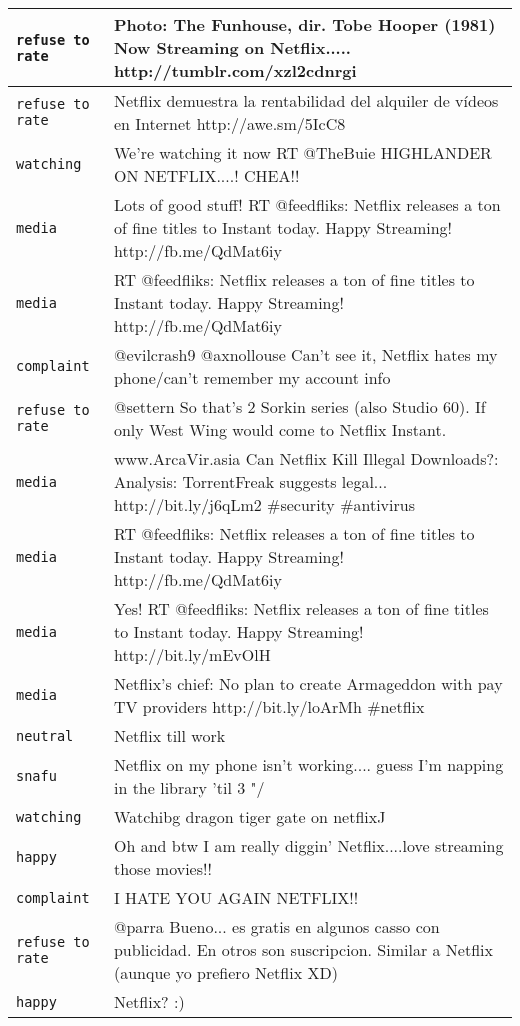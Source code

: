 \begin{center}
\begin{longtable}{|l|p{120mm}|}
      \tabularnewline\hline
         \texttt{refuse to rate} & Photo: The Funhouse, dir. Tobe Hooper (1981) Now Streaming on Netflix..... http://tumblr.com/xzl2cdnrgi
      \tabularnewline\hline
         \texttt{refuse to rate} & Netflix demuestra la rentabilidad del alquiler de vídeos en Internet http://awe.sm/5IcC8
      \tabularnewline\hline
         \texttt{watching} & We're watching it now RT @TheBuie HIGHLANDER ON NETFLIX....! CHEA!!
      \tabularnewline\hline
         \texttt{media} & Lots of good stuff! RT @feedfliks: Netflix releases a ton of fine titles to Instant today. Happy Streaming! http://fb.me/QdMat6iy
      \tabularnewline\hline
         \texttt{media} & RT @feedfliks: Netflix releases a ton of fine titles to Instant today. Happy Streaming! http://fb.me/QdMat6iy
      \tabularnewline\hline
         \texttt{complaint} & @evilcrash9 @axnollouse Can't see it, Netflix hates my phone/can't remember my account info
      \tabularnewline\hline
         \texttt{refuse to rate} & @settern So that's 2 Sorkin series (also Studio 60). If only West Wing would come to Netflix Instant.
      \tabularnewline\hline
         \texttt{media} & www.ArcaVir.asia Can Netflix Kill Illegal Downloads?: Analysis: TorrentFreak suggests legal... http://bit.ly/j6qLm2 \#security \#antivirus
      \tabularnewline\hline
         \texttt{media} & RT @feedfliks: Netflix releases a ton of fine titles to Instant today. Happy Streaming! http://fb.me/QdMat6iy
      \tabularnewline\hline
         \texttt{media} & Yes! RT @feedfliks: Netflix releases a ton of fine titles to Instant today. Happy Streaming! http://bit.ly/mEvOlH
      \tabularnewline\hline
         \texttt{media} & Netflix's chief: No plan to create Armageddon with pay TV providers http://bit.ly/loArMh \#netflix
      \tabularnewline\hline
         \texttt{neutral} & Netflix till work
      \tabularnewline\hline
         \texttt{snafu} & Netflix on my phone isn't working.... guess I'm napping in the library 'til 3 "/
      \tabularnewline\hline
         \texttt{watching} & Watchibg dragon tiger gate on netflix^^
      \tabularnewline\hline
         \texttt{happy} & Oh and btw I am really diggin' Netflix....love streaming those movies!!
      \tabularnewline\hline
         \texttt{complaint} & I HATE YOU AGAIN NETFLIX!!
      \tabularnewline\hline
         \texttt{refuse to rate} & @parra Bueno... es gratis en algunos casso con publicidad. En otros son suscripcion. Similar a Netflix (aunque yo prefiero Netflix XD)
      \tabularnewline\hline
         \texttt{happy} & Netflix? :)
      \tabularnewline\hline
   \end{longtable}
\end{center}
